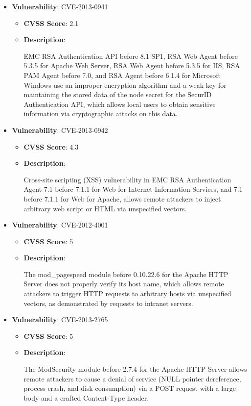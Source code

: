 \documentclass{article}
\begin{document}
\begin{itemize}
    
        \item \textbf{Vulnerability}: CVE-2013-0941
        \begin{itemize}
            \item \textbf{CVSS Score}:  2.1 
            \item \textbf{Description}:
            \parbox[t]{0.9\linewidth}{
                \ttfamily EMC RSA Authentication API before 8.1 SP1, RSA Web Agent before 5.3.5 for Apache Web Server, RSA Web Agent before 5.3.5 for IIS, RSA PAM Agent before 7.0, and RSA Agent before 6.1.4 for Microsoft Windows use an improper encryption algorithm and a weak key for maintaining the stored data of the node secret for the SecurID Authentication API, which allows local users to obtain sensitive information via cryptographic attacks on this data.
            }
        \end{itemize}
    
        \item \textbf{Vulnerability}: CVE-2013-0942
        \begin{itemize}
            \item \textbf{CVSS Score}:  4.3 
            \item \textbf{Description}:
            \parbox[t]{0.9\linewidth}{
                \ttfamily Cross-site scripting (XSS) vulnerability in EMC RSA Authentication Agent 7.1 before 7.1.1 for Web for Internet Information Services, and 7.1 before 7.1.1 for Web for Apache, allows remote attackers to inject arbitrary web script or HTML via unspecified vectors.
            }
        \end{itemize}
    
        \item \textbf{Vulnerability}: CVE-2012-4001
        \begin{itemize}
            \item \textbf{CVSS Score}:  5 
            \item \textbf{Description}:
            \parbox[t]{0.9\linewidth}{
                \ttfamily The mod\_pagespeed module before 0.10.22.6 for the Apache HTTP Server does not properly verify its host name, which allows remote attackers to trigger HTTP requests to arbitrary hosts via unspecified vectors, as demonstrated by requests to intranet servers.
            }
        \end{itemize}
    
        \item \textbf{Vulnerability}: CVE-2013-2765
        \begin{itemize}
            \item \textbf{CVSS Score}:  5 
            \item \textbf{Description}:
            \parbox[t]{0.9\linewidth}{
                \ttfamily The ModSecurity module before 2.7.4 for the Apache HTTP Server allows remote attackers to cause a denial of service (NULL pointer dereference, process crash, and disk consumption) via a POST request with a large body and a crafted Content-Type header.
            }
        \end{itemize}
    

\end{itemize}
\end{document}

